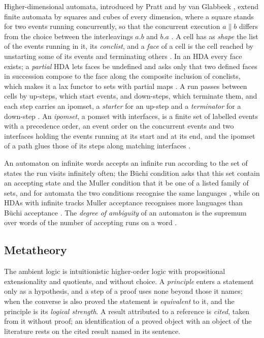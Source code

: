 \documentclass{lmcs}
\theoremstyle{definition}
\theoremstyle{remark}
\begin{document}
Higher-dimensional automata, introduced by Pratt and by van Glabbeek
\cite{Pratt91,vG91}, extend finite automata by squares and
cubes of every dimension, where a square stands for two events running concurrently, so that the concurrent execution
$a\parallel b$ differs from the choice between the interleavings $a.b$ and $b.a$
\cite{FJSZ21}. A cell has as \emph{shape} the list of
the events running in it, its \emph{conclist}, and a \emph{face} of a cell is the cell reached by unstarting some of
its events and terminating others \cite{BDFZ26}. In an HDA
every face exists; a \emph{partial} HDA lets faces be undefined and asks only that two defined faces in succession
compose to the face along the composite inclusion of conclists, which makes it a lax functor to sets with partial
maps \cite{BDFZ26}. A run passes between cells by up-steps,
which start events, and down-steps, which terminate them, and each step carries an ipomset, a \emph{starter} for an
up-step and a \emph{terminator} for a down-step
\cite{BDFZ26}\cite{PAF25}.
An \emph{ipomset}, a pomset with interfaces, is a finite set of labelled events with a precedence order, an event
order on the concurrent events and two interfaces holding the events running at its start and at its end, and the
ipomset of a path glues those of its steps along matching interfaces
\cite{BDFZ26}.

An automaton on infinite words accepts an infinite run according to the set of states the run visits infinitely
often; the B\"uchi condition asks that this set contain an accepting state \cite{LP18}
and the Muller condition that it be one of a listed family of sets, and for automata the two conditions recognise the
same languages \cite{PAF25},
while on HDAs with infinite tracks Muller acceptance recognises more languages than B\"uchi acceptance
\cite{PAF25}. The \emph{degree of ambiguity} of an automaton is the
supremum over words of the number of accepting runs on a word
\cite{LP18}.

\subsection{Metatheory}\label{ssec:meta}\label{conv:principles}

The ambient logic is intuitionistic higher-order logic with propositional extensionality and quotients, and
without choice. A \emph{principle} enters a statement only as a hypothesis, and a step of a proof uses none beyond those it
names; when the converse is also proved the statement is \emph{equivalent} to it, and the principle is its
\emph{logical strength}. A result
attributed to a reference is \emph{cited}, taken from it without proof; an identification of a proved object with an
object of the literature rests on the cited result named in its sentence.
\end{document}
